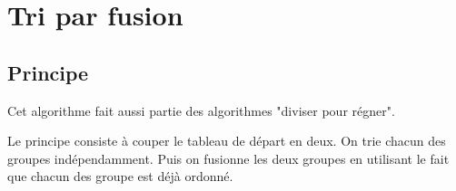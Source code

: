 %
%
\section{Tri par fusion}

\subsection{Principe}


Cet algorithme fait aussi partie des algorithmes "diviser pour régner".

Le principe consiste à couper le tableau de départ en deux. On trie chacun des groupes indépendamment. Puis on fusionne les deux groupes en utilisant le fait que chacun des groupe est déjà ordonné.

